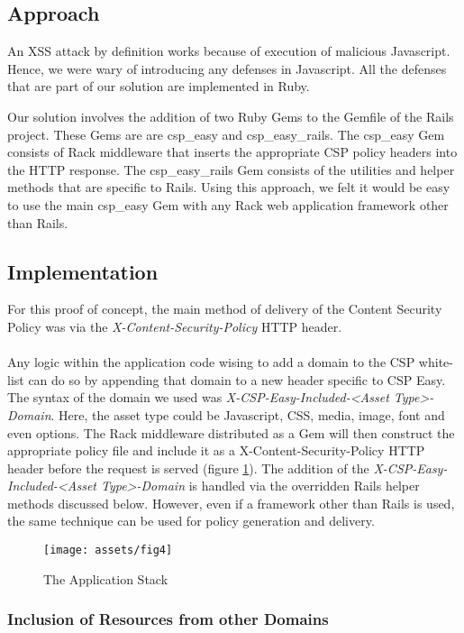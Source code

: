 \documentclass[10pt, conference, compsocconf]{IEEEtran}
\begin{document}
\subsection{Approach} %
\label{sub:approach}
An XSS attack by definition works because of execution of malicious Javascript. Hence, we were wary of introducing any defenses in Javascript. All the defenses that are part of our solution are implemented in Ruby.

Our solution involves the addition of two Ruby Gems to the Gemfile of the Rails project. These Gems are are csp\_easy and csp\_easy\_rails. The csp\_easy Gem consists of Rack middleware that inserts the appropriate CSP policy headers into the HTTP response. The csp\_easy\_rails Gem consists of the utilities and helper methods that are specific to Rails. Using this approach, we felt it would be easy to use the main csp\_easy Gem with any Rack web application framework other than Rails.

\subsection{Implementation} %
\label{sub:implementation}
For this proof of concept, the main method of delivery of the Content Security Policy was via the \emph{X-Content-Security-Policy} HTTP header.
\\\\
Any logic within the application code wising to add a domain to the CSP white-list can do so by appending that domain to a new header specific to CSP Easy. The syntax of the domain we used was \emph{X-CSP-Easy-Included-<Asset Type>-Domain}. Here, the asset type could be Javascript, CSS, media, image, font and even options. The Rack middleware distributed as a Gem will then construct the appropriate policy file and include it as a X-Content-Security-Policy HTTP header before the request is served (figure \ref{fig:app_stack}). The addition of the \emph{X-CSP-Easy-Included-<Asset Type>-Domain} is handled via the overridden Rails helper methods discussed below. However, even if a framework other than Rails is used, the same technique can be used for policy generation and delivery.

\begin{figure}[hb]
 \caption{The Application Stack}
 \label{fig:app_stack}
 \centering
 \texttt{[image: assets/fig4]}
\end{figure}

\subsubsection{Inclusion of Resources from other Domains} %
\label{ssub:inclusion_of_resources_from_other_domains}
\end{document}
